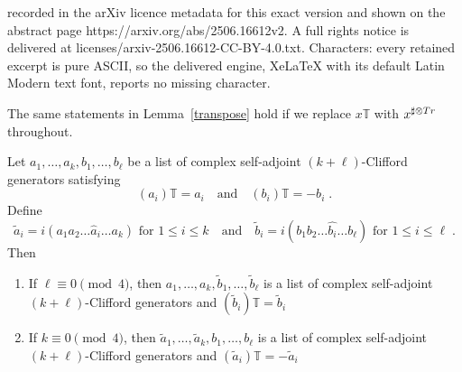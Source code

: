 \documentclass[10pt,a4paper]{amsart}
\def\T{{\mathbb T}}
\def\sT{ ^{\sharp \otimes {\rm{Tr}}}}
\begin{document}
recorded in the arXiv licence metadata for this exact version and shown on the abstract page https://arxiv.org/abs/2506.16612v2. A full rights notice is delivered at licenses/arxiv-2506.16612-CC-BY-4.0.txt. Characters: every retained excerpt is pure ASCII, so the delivered engine, XeLaTeX with its default Latin Modern text font, reports no missing character.
\begin{lemma} \label{sharp}
The same statements in Lemma~\ref{transpose} hold if we replace $x\T$ with $x\sT$ throughout.
\end{lemma}

\begin{lemma} \label{transpose}
Let $a_1, \dots, a_k, b_1, \dots, b_\ell$ be a list of complex self-adjoint $(k + \ell)$-Clifford generators satisfying
$$(a_i)\T = a_i \quad \text{and} \quad (b_i)\T = -b_i \; .$$
Define 
$$\widetilde a_i = i (a_1 a_2 \dots \widehat a _i \dots a_k) \text{~for $1 \leq i \leq k$} 
\quad \text{and} \quad \widetilde b _i = i (b_1 b_2 \dots \widehat{b_i} \dots b_\ell) \text{~for $1 \leq i \leq \ell$} \; .
$$
Then
\begin{enumerate}
\item If $\ell \equiv 0 \pmod 4$, then
$a_1, \dots, a_k, \widetilde b_1, \dots, \widetilde b_\ell$ is a list of complex self-adjoint $(k + \ell)$-Clifford generators 
and $(\widetilde{b}_i)\T = \widetilde{b}_i$
\item If $k \equiv 0 \pmod 4$, then
$\widetilde{a}_1, \dots, \widetilde{a}_k, b_1, \dots, b_\ell$ is a list of complex self-adjoint $(k + \ell)$-Clifford generators 
and $(\widetilde{a}_i)\T = -\widetilde{a}_i$
\end{enumerate}
\end{lemma}
\end{document}
